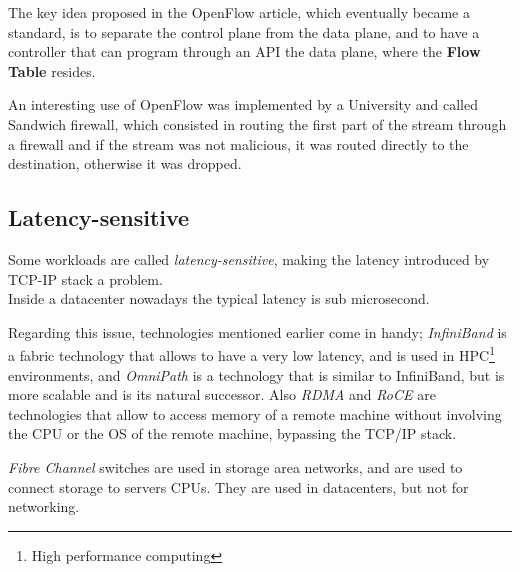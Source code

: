 The key idea proposed in the OpenFlow article, which eventually became a standard, is to separate the control plane from the data plane, and to have a controller that can program through an API the data plane, where the \textbf{Flow Table} resides.

An interesting use of OpenFlow was implemented by a University and called Sandwich firewall, which consisted in routing the first part of the stream through a firewall and if the stream was not malicious, it was routed directly to the destination, otherwise it was dropped.

\subsection*{Latency-sensitive}
Some workloads are called \textit{latency-sensitive}, making the latency introduced by TCP-IP stack a problem.\\
Inside a datacenter nowadays the typical latency is sub microsecond.

Regarding this issue, technologies mentioned earlier come in handy; 
\textit{InfiniBand} is a fabric technology that allows to have a very low latency, and is used in HPC\footnote{High performance computing} environments, and \textit{OmniPath} is a technology that is similar to InfiniBand, but is more scalable and is its natural successor.
Also \textit{RDMA} and \textit{RoCE} are technologies that allow to access memory of a remote machine without involving the CPU or the OS of the remote machine, bypassing the TCP/IP stack.

\textit{Fibre Channel} switches are used in storage area networks, and are used to connect storage to servers CPUs. They are used in datacenters, but not for networking.